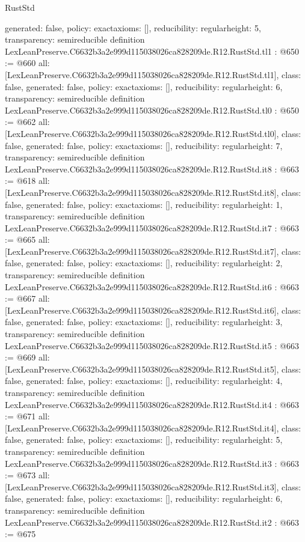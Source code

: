\begin{lexlean}{RustStd}
\begin{coremodule}
{  generated: false,
  policy: exact{axioms: []},
  reducibility: regular{height: 5},
  transparency: semireducible
}
definition LexLeanPreserve.C6632b3a2e999d115038026ca828209de.R12.RustStd.tl1 : @650 := @660 {
  all: [LexLeanPreserve.C6632b3a2e999d115038026ca828209de.R12.RustStd.tl1],
  class: false,
  generated: false,
  policy: exact{axioms: []},
  reducibility: regular{height: 6},
  transparency: semireducible
}
definition LexLeanPreserve.C6632b3a2e999d115038026ca828209de.R12.RustStd.tl0 : @650 := @662 {
  all: [LexLeanPreserve.C6632b3a2e999d115038026ca828209de.R12.RustStd.tl0],
  class: false,
  generated: false,
  policy: exact{axioms: []},
  reducibility: regular{height: 7},
  transparency: semireducible
}
definition LexLeanPreserve.C6632b3a2e999d115038026ca828209de.R12.RustStd.it8 : @663 := @618 {
  all: [LexLeanPreserve.C6632b3a2e999d115038026ca828209de.R12.RustStd.it8],
  class: false,
  generated: false,
  policy: exact{axioms: []},
  reducibility: regular{height: 1},
  transparency: semireducible
}
definition LexLeanPreserve.C6632b3a2e999d115038026ca828209de.R12.RustStd.it7 : @663 := @665 {
  all: [LexLeanPreserve.C6632b3a2e999d115038026ca828209de.R12.RustStd.it7],
  class: false,
  generated: false,
  policy: exact{axioms: []},
  reducibility: regular{height: 2},
  transparency: semireducible
}
definition LexLeanPreserve.C6632b3a2e999d115038026ca828209de.R12.RustStd.it6 : @663 := @667 {
  all: [LexLeanPreserve.C6632b3a2e999d115038026ca828209de.R12.RustStd.it6],
  class: false,
  generated: false,
  policy: exact{axioms: []},
  reducibility: regular{height: 3},
  transparency: semireducible
}
definition LexLeanPreserve.C6632b3a2e999d115038026ca828209de.R12.RustStd.it5 : @663 := @669 {
  all: [LexLeanPreserve.C6632b3a2e999d115038026ca828209de.R12.RustStd.it5],
  class: false,
  generated: false,
  policy: exact{axioms: []},
  reducibility: regular{height: 4},
  transparency: semireducible
}
definition LexLeanPreserve.C6632b3a2e999d115038026ca828209de.R12.RustStd.it4 : @663 := @671 {
  all: [LexLeanPreserve.C6632b3a2e999d115038026ca828209de.R12.RustStd.it4],
  class: false,
  generated: false,
  policy: exact{axioms: []},
  reducibility: regular{height: 5},
  transparency: semireducible
}
definition LexLeanPreserve.C6632b3a2e999d115038026ca828209de.R12.RustStd.it3 : @663 := @673 {
  all: [LexLeanPreserve.C6632b3a2e999d115038026ca828209de.R12.RustStd.it3],
  class: false,
  generated: false,
  policy: exact{axioms: []},
  reducibility: regular{height: 6},
  transparency: semireducible
}
definition LexLeanPreserve.C6632b3a2e999d115038026ca828209de.R12.RustStd.it2 : @663 := @675 {
}
\end{coremodule}
\end{lexlean}
